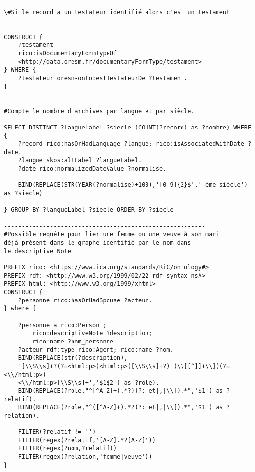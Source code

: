 \begin{verbatim}
---------------------------------------------------------
\#Si le record a un testateur identifié alors c'est un testament


CONSTRUCT {
    ?testament 
    rico:isDocumentaryFormTypeOf 
    <http://data.oresm.fr/documentaryFormType/testament>
} WHERE { 
	?testateur oresm-onto:estTestateurDe ?testament.
}

---------------------------------------------------------
#Compte le nombre d'archives par langue et par siècle.

SELECT DISTINCT ?langueLabel ?siecle (COUNT(?record) as ?nombre) WHERE {
    ?record rico:hasOrHadLanguage ?langue; rico:isAssociatedWithDate ?date.
    ?langue skos:altLabel ?langueLabel.
    ?date rico:normalizedDateValue ?normalise.
    
    BIND(REPLACE(STR(YEAR(?normalise)+100),'[0-9]{2}$',' ème siècle') as ?siecle)
    
} GROUP BY ?langueLabel ?siecle ORDER BY ?siecle

---------------------------------------------------------
#Possible requête pour lier une femme ou une veuve à son mari
déjà présent dans le graphe identifié par le nom dans
le descriptive Note

PREFIX rico: <https://www.ica.org/standards/RiC/ontology#>
PREFIX rdf: <http://www.w3.org/1999/02/22-rdf-syntax-ns#>
PREFIX html: <http://www.w3.org/1999/xhtml>
CONSTRUCT {
    ?personne rico:hasOrHadSpouse ?acteur.
} where { 
    
	?personne a rico:Person ; 
        rico:descriptiveNote ?description; 
        rico:name ?nom_personne.
    ?acteur rdf:type rico:Agent; rico:name ?nom.
    BIND(REPLACE(str(?description),
    '[\\S\\s]+?(?=<html:p>)<html:p>([\\S\\s]+?) (\\[[^]]+\\])(?=<\\/html:p>)
    <\\/html:p>[\\S\\s]+','$1$2') as ?role).
    BIND(REPLACE(?role,"^[^A-Z]+(.*?)(?: et|,|\\[).*",'$1') as ?relatif).
    BIND(REPLACE(?role,"^([^A-Z]+).*?(?: et|,|\\[).*",'$1') as ?relation).
    
    FILTER(?relatif != '')
    FILTER(regex(?relatif,'[A-Z].*?[A-Z]'))
    FILTER(regex(?nom,?relatif))
    FILTER(regex(?relation,'femme|veuve'))
}
\end{verbatim}